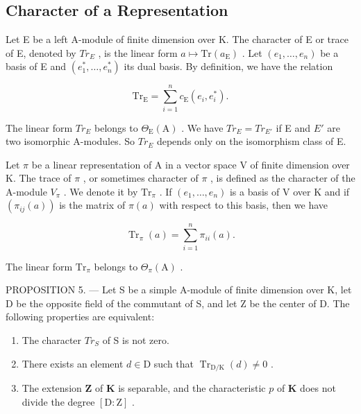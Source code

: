 \subsection{Character of a Representation}

Let E be a left A-module of finite dimension over K. The character of E or trace of E, denoted by \(Tr_{E}\) , is the linear form \(a \mapsto \mathrm{Tr}(a_{\mathrm{E}})\) . Let \((e_{1}, \ldots, e_{n})\) be a basis of E and \((e_{1}^{*}, \ldots, e_{n}^{*})\) its dual basis. By definition, we have the relation

\[
\mathrm{Tr} _ {\mathrm{E}} = \sum_ {i = 1} ^ {n} c _ {\mathrm{E}} (e _ {i}, e _ {i} ^ {*}).\tag{7}
\]

The linear form \(Tr_{E}\) belongs to \(\Theta_{\mathrm{E}}(\mathrm{A})\) . We have \(Tr_{E} = Tr_{E'}\) if E and \(E'\) are two isomorphic A-modules. So \(Tr_{E}\) depends only on the isomorphism class of E.

Let \(\pi\) be a linear representation of A in a vector space V of finite dimension over K. The trace of \(\pi\) , or sometimes character of \(\pi\) , is defined as the character of the A-module \(V_{\pi}\) . We denote it by \(\mathrm{Tr}_{\pi}\) . If \((e_1, \ldots, e_n)\) is a basis of V over K and if \((\pi_{ij}(a))\) is the matrix of \(\pi(a)\) with respect to this basis, then we have

\[
\operatorname{Tr} _ {\pi} (a) = \sum_ {i = 1} ^ {n} \pi_ {i i} (a).\tag{8}
\]

The linear form \(\mathrm{Tr}_{\pi}\) belongs to \(\Theta_{\pi}(\mathrm{A})\) .

PROPOSITION 5. --- Let S be a simple A-module of finite dimension over K, let D be the opposite field of the commutant of S, and let Z be the center of D. The following properties are equivalent:

\begin{enumerate}
\def\labelenumi{(\roman{enumi})}
\item
  The character \(Tr_{S}\) of S is not zero.
\item
  There exists an element \(d \in \mathrm{D}\) such that \(\operatorname{Tr}_{\mathrm{D} / \mathrm{K}}(d) \neq 0\) .
\item
  The extension \(\mathbf{Z}\) of \(\mathbf{K}\) is separable, and the characteristic \(p\) of \(\mathbf{K}\) does not divide the degree \([\mathrm{D}:\mathrm{Z}]\) .
\end{enumerate}

